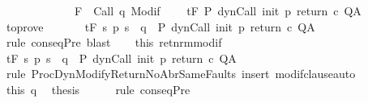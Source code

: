 \begin{isabellebody}
\ \ \ \ \ \ \ \ \ \ \ \ {\isachardoublequoteopen}{\isasymforall}{\isasymsigma}{\isachardot}\ {\isasymGamma}{\isacharcomma}{\isasymTheta}{\isasymturnstile}\isactrlbsub {\isacharslash}F\isactrlesub \ {\isacharbraceleft}{\isasymsigma}{\isacharbraceright}\ {\isacharparenleft}Call\ q{\isacharparenright}\ {\isacharparenleft}Modif\ {\isasymsigma}{\isacharparenright}{\isacharcomma}{\isacharbraceleft}{\isacharbraceright}{\isachardoublequoteclose}\isanewline
\ \ \ {\isachardoublequoteopen}{\isasymGamma}{\isacharcomma}{\isasymTheta}{\isasymturnstile}\isactrlsub t\isactrlbsub {\isacharslash}F\isactrlesub \ P\ {\isacharparenleft}dynCall\ init\ p\ return\ c{\isacharparenright}\ Q{\isacharcomma}A{\isachardoublequoteclose}\isanewline
%
\isadelimproof
%
\endisadelimproof
%
\isatagproof
{}\isamarkupfalse%
\ {\isacharminus}\isanewline
\ \ \isamarkupfalse%
\ to{\isacharunderscore}prove\ \isamarkupfalse%
\ \isanewline
\ \ \ \ {\isachardoublequoteopen}{\isasymGamma}{\isacharcomma}{\isasymTheta}{\isasymturnstile}\isactrlsub t\isactrlbsub {\isacharslash}F\isactrlesub \ {\isacharparenleft}{\isacharbraceleft}s{\isachardot}\ p\ s\ {\isacharequal}\ q{\isacharbraceright}\ {\isasyminter}\ P{\isacharprime}{\isacharparenright}\ {\isacharparenleft}dynCall\ init\ p\ return{\isacharprime}\ c{\isacharparenright}\ Q{\isacharcomma}A{\isachardoublequoteclose}\isanewline
\ \ \ \ \isamarkupfalse%
\ {\isacharparenleft}rule\ conseqPre{\isacharparenright}\ blast\isanewline
\ \ \isamarkupfalse%
\ this\ ret{\isacharunderscore}nrm{\isacharunderscore}modif\ \isanewline
\ \ \isamarkupfalse%
\ {\isachardoublequoteopen}{\isasymGamma}{\isacharcomma}{\isasymTheta}{\isasymturnstile}\isactrlsub t\isactrlbsub {\isacharslash}F\isactrlesub \ {\isacharparenleft}{\isacharbraceleft}s{\isachardot}\ p\ s\ {\isacharequal}\ q{\isacharbraceright}\ {\isasyminter}\ P{\isacharprime}{\isacharparenright}\ {\isacharparenleft}dynCall\ init\ p\ return\ c{\isacharparenright}\ Q{\isacharcomma}A{\isachardoublequoteclose}\isanewline
\ \ \ \ \isamarkupfalse%
\ {\isacharparenleft}rule\ ProcDynModifyReturnNoAbrSameFaults{\isacharparenright}\ {\isacharparenleft}insert\ modif{\isacharunderscore}clause{\isacharcomma}auto{\isacharparenright}\isanewline
\ \ \isamarkupfalse%
\ this\ q\ \isamarkupfalse%
\ {\isacharquery}thesis\isanewline
\ \ \ \ \isamarkupfalse%
\ {\isacharparenleft}rule\ conseqPre{\isacharparenright}\ \isanewline
{}\isamarkupfalse%

\end{isabellebody}
